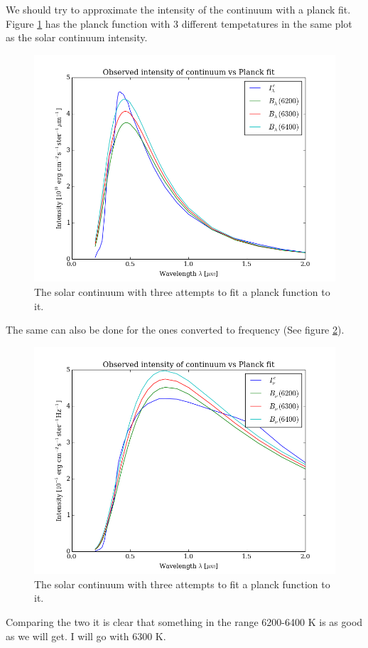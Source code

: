 \documentclass{aa}   %
\begin{document}
We should try to approximate the intensity of the continuum with a planck fit.
Figure \ref{planckfit} has the planck function with 3 different tempetatures in the same plot as the solar continuum intensity. 
\begin{figure}
 \includegraphics[width=.49\textwidth]{planckfit.png}
 \caption{The solar continuum with three attempts to fit a planck function to it.}
 \label{planckfit} 
\end{figure}
The same can also be done for the ones converted to frequency (See figure \ref{planckfit_freq}).
\begin{figure}
 \includegraphics[width=.49\textwidth]{planckfit_freq.png}
 \caption{The solar continuum with three attempts to fit a planck function to it.}
 \label{planckfit_freq} 
\end{figure}
Comparing the two it is clear that something in the range 6200-6400 K is as good as we will get. I will go with 6300 K.
\end{document}
